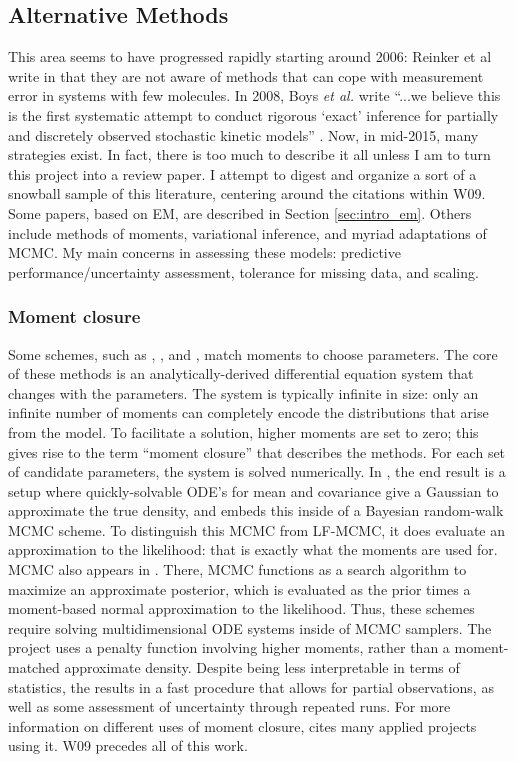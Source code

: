 \documentclass{article}
\begin{document}
\subsection{Alternative Methods}
This area seems to have progressed rapidly starting around 2006: Reinker et al write in \cite{reinker2006parameter} that they are not aware of methods that can cope with measurement error in systems with few molecules. In 2008, Boys \textit{et al.} write ``...we believe this is
the first systematic attempt to conduct rigorous `exact' inference for partially and discretely observed stochastic kinetic models'' \cite{Boys2008}. Now, in mid-2015, many strategies exist. In fact, there is too much to describe it all unless I am to turn this project into a review paper. I attempt to digest and organize a sort of a snowball sample of this literature, centering around the citations within W09. Some papers, based on EM, are described in Section \ref{sec:intro_em}. Others include methods of moments, variational inference, and myriad adaptations of MCMC. My main concerns in assessing these models: predictive performance/uncertainty assessment, tolerance for missing data, and scaling.

\subsubsection{Moment closure}
Some schemes, such as \cite{milner2013moment}, \cite{kugler2012moment}, and \cite{zechner2012moment}, match moments to choose parameters. The core of these methods is an analytically-derived differential equation system that changes with the parameters. The system is typically infinite in size: only an infinite number of moments can completely encode the distributions that arise from the model. To facilitate a solution, higher moments are set to zero; this gives rise to the term ``moment closure'' that describes the methods. For each set of candidate parameters, the system is solved numerically. In \cite{milner2013moment}, the end result is a setup where quickly-solvable ODE's for mean and covariance give a Gaussian to approximate the true density, and \cite{milner2013moment} embeds this inside of a Bayesian random-walk MCMC scheme. To distinguish this MCMC from LF-MCMC, it does evaluate an approximation to the likelihood: that is exactly what the moments are used for. MCMC also appears in \cite{zechner2012moment}. There, MCMC functions as a search algorithm to maximize an approximate posterior, which is evaluated as the prior times a moment-based normal approximation to the likelihood. Thus, these schemes require solving multidimensional ODE systems inside of MCMC samplers. The project  \cite{kugler2012moment} uses a penalty function involving higher moments, rather than a moment-matched approximate density. Despite being less interpretable in terms of statistics, the results in a fast procedure that allows for partial observations, as well as some assessment of uncertainty through repeated runs. For more information on different uses of moment closure, \cite{Milner201199} cites many applied projects using it. W09 precedes all of this work. 
\end{document}
